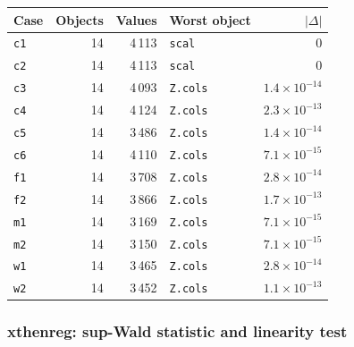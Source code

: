 \begin{longtable}{@{}p{3.6cm}rrp{4.9cm}r@{}}
\toprule
Case & Objects & Values & Worst object & $|\Delta|$ \\
\midrule
\endhead
\texttt{c1} & 14 & 4\,113 & \texttt{scal} & 0 \\
\texttt{c2} & 14 & 4\,113 & \texttt{scal} & 0 \\
\texttt{c3} & 14 & 4\,093 & \texttt{Z.cols} & $1.4\times10^{-14}$ \\
\texttt{c4} & 14 & 4\,124 & \texttt{Z.cols} & $2.3\times10^{-13}$ \\
\texttt{c5} & 14 & 3\,486 & \texttt{Z.cols} & $1.4\times10^{-14}$ \\
\texttt{c6} & 14 & 4\,110 & \texttt{Z.cols} & $7.1\times10^{-15}$ \\
\texttt{f1} & 14 & 3\,708 & \texttt{Z.cols} & $2.8\times10^{-14}$ \\
\texttt{f2} & 14 & 3\,866 & \texttt{Z.cols} & $1.7\times10^{-13}$ \\
\texttt{m1} & 14 & 3\,169 & \texttt{Z.cols} & $7.1\times10^{-15}$ \\
\texttt{m2} & 14 & 3\,150 & \texttt{Z.cols} & $7.1\times10^{-15}$ \\
\texttt{w1} & 14 & 3\,465 & \texttt{Z.cols} & $2.8\times10^{-14}$ \\
\texttt{w2} & 14 & 3\,452 & \texttt{Z.cols} & $1.1\times10^{-13}$ \\
\bottomrule
\end{longtable}

\subsubsection*{xthenreg: sup-Wald statistic and linearity test}

